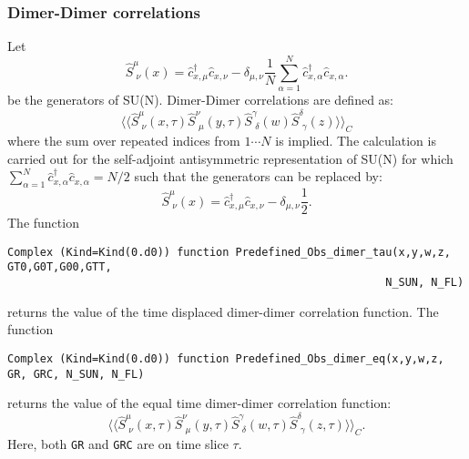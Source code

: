 

\subsubsection{   Dimer-Dimer correlations }
Let  
\begin{equation}
	\hat{S}^{\mu}_{\, \,  \nu} (x)  =  \hat{c}^{\dagger}_{x,\mu} \hat{c}^{}_{x,\nu}    - \delta_{\mu,\nu} \frac{1}{N}  \sum_{\alpha = 1}^{N} \hat{c}^{\dagger}_{x,\alpha} \hat{c}^{}_{x,\alpha}.   
\end{equation}
be the generators of SU(N). 
Dimer-Dimer correlations are defined  as: 
\begin{equation}
 \langle \langle \hat{S}^{\mu}_{\, \,  \nu} (x,\tau)   \hat{S}^{\nu}_{\, \,  \mu} (y,\tau) 
              \hat{S}^{\gamma}_{\, \,  \delta} (w)   \hat{S}^{\delta}_{\, \,  \gamma} (z)   \rangle   \rangle_C  
\end{equation}
where the sum   over repeated indices   from $ 1 \cdots N $ is implied. 
The calculation is carried out  for the self-adjoint antisymmetric  representation of SU(N)   for which $ \sum_{\alpha = 1}^{N} \hat{c}^{\dagger}_{x,\alpha} \hat{c}^{}_{x,\alpha}  = N/2$   such that the generators can be replaced by: 
\begin{equation}
	\hat{S}^{\mu}_{\, \,  \nu} (x)  =  \hat{c}^{\dagger}_{x,\mu} \hat{c}^{}_{x,\nu}    - \delta_{\mu,\nu} \frac{1}{2}. 
\end{equation}
The  function 
\begin{lstlisting}[style=fortran]
Complex (Kind=Kind(0.d0)) function Predefined_Obs_dimer_tau(x,y,w,z, GT0,G0T,G00,GTT, 
                                                          N_SUN, N_FL)  
\end{lstlisting}
returns the   value of the time displaced   dimer-dimer correlation function. 
The  function 
\begin{lstlisting}[style=fortran]
Complex (Kind=Kind(0.d0)) function Predefined_Obs_dimer_eq(x,y,w,z, GR, GRC, N_SUN, N_FL)
\end{lstlisting}
returns the   value of the equal time  dimer-dimer correlation function:
\begin{equation}
 \langle \langle \hat{S}^{\mu}_{\, \,  \nu} (x,\tau)   \hat{S}^{\nu}_{\, \,  \mu} (y,\tau) 
              \hat{S}^{\gamma}_{\, \,  \delta} (w,\tau)   \hat{S}^{\delta}_{\, \,  \gamma} (z,\tau)   \rangle   \rangle_C.  
\end{equation}
Here,  both \texttt{GR}  and  \texttt{GRC}  are on time slice  $\tau$.

